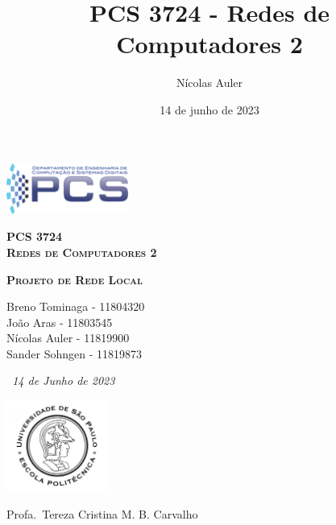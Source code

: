 \documentclass[12pt, a4paper]{nic_format}
\title{PCS 3724 - Redes de Computadores 2}
\date{14 de junho de 2023}
\author{Nícolas Auler}
\begin{document}
\begin{titlepage}

{\centering\includegraphics[width=0.3\textwidth]{pcs.png}\par}
\vspace{0.1cm}%
{\centering\scshape\LARGE\bfseries{PCS 3724\\Redes de Computadores 2}\par}
\vspace{0.2cm}%
{\centering\scshape\Large\bfseries Projeto de Rede Local\par}
{\centering\Large Breno Tominaga \-- 11804320\\João Aras \-- 11803545\\Nícolas Auler \-- 11819900\\Sander Sohngen \-- 11819873\\\par}
\vspace{0.1cm}%
{\centering\large\itshape\ 14 de Junho de 2023\par}%
\vspace{0.2cm}%


\setcounter{tocdepth}{2}    %
\tableofcontents

\vfill
{\centering
    \includegraphics[width=0.25\textwidth]{poli-usp.jpg}\par
    \vspace{0.5cm}
    {Profa.\ Tereza Cristina M. B. Carvalho\par}
}
\end{titlepage}

\newpage
{}

\onehalfspace


\newpage

\newpage

\newpage

\newpage


\newpage
\listoftables

\nocite{*}


\end{document}
